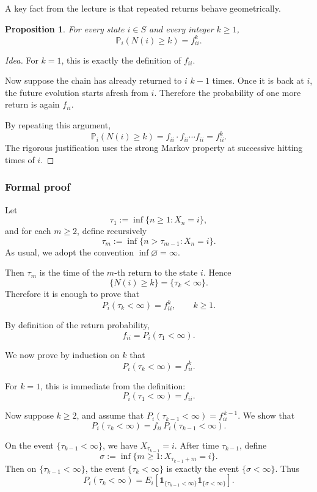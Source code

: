 \documentclass[11pt]{article}
\newtheorem{proposition}[theorem]{Proposition}
\theoremstyle{definition}
\begin{document}
A key fact from the lecture is that repeated returns behave geometrically.

\begin{proposition}
For every state \(i\in S\) and every integer \(k\ge 1\),
\[
\mathbb P_i(N(i)\ge k)=f_{ii}^k.
\]
\end{proposition}

\begin{proof}[Idea]
For \(k=1\), this is exactly the definition of \(f_{ii}\).

Now suppose the chain has already returned to \(i\) \(k-1\) times. Once it is back at \(i\), the future evolution starts afresh from \(i\). Therefore the probability of one more return is again \(f_{ii}\).

By repeating this argument,
\[
\mathbb P_i(N(i)\ge k)
=
f_{ii}\cdot f_{ii}\cdots f_{ii}
=
f_{ii}^k.
\]
The rigorous justification uses the strong Markov property at successive hitting times of \(i\).
\end{proof}

\subsubsection*{Formal proof}

Let
\[
\tau_1:=\inf\{n\ge 1:X_n=i\},
\]
and for each \(m\ge 2\), define recursively
\[
\tau_m:=\inf\{n>\tau_{m-1}:X_n=i\}.
\]
As usual, we adopt the convention \(\inf\varnothing=\infty\).

Then \(\tau_m\) is the time of the \(m\)-th return to the state \(i\). Hence
\[
\{N(i)\ge k\}=\{\tau_k<\infty\}.
\]
Therefore it is enough to prove that
\[
P_i(\tau_k<\infty)=f_{ii}^k,\qquad k\ge 1.
\]

By definition of the return probability,
\[
f_{ii}=P_i(\tau_1<\infty).
\]

We now prove by induction on \(k\) that
\[
P_i(\tau_k<\infty)=f_{ii}^k.
\]

For \(k=1\), this is immediate from the definition:
\[
P_i(\tau_1<\infty)=f_{ii}.
\]

Now suppose \(k\ge 2\), and assume that \(P_i(\tau_{k-1}<\infty)=f_{ii}^{\,k-1}\). We show that
\[
P_i(\tau_k<\infty)=f_{ii}\,P_i(\tau_{k-1}<\infty).
\]

On the event \(\{\tau_{k-1}<\infty\}\), we have \(X_{\tau_{k-1}}=i\). After time \(\tau_{k-1}\), define
\[
\sigma:=\inf\{m\ge 1:X_{\tau_{k-1}+m}=i\}.
\]
Then on \(\{\tau_{k-1}<\infty\}\), the event \(\{\tau_k<\infty\}\) is exactly the event \(\{\sigma<\infty\}\). Thus
\[
P_i(\tau_k<\infty)
=
E_i\!\left[\mathbf{1}_{\{\tau_{k-1}<\infty\}}\mathbf{1}_{\{\sigma<\infty\}}\right].
\]
\end{document}
